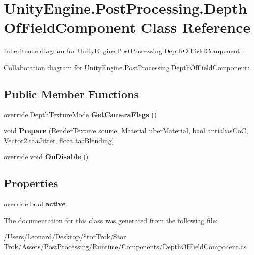 \hypertarget{class_unity_engine_1_1_post_processing_1_1_depth_of_field_component}{}\section{Unity\+Engine.\+Post\+Processing.\+Depth\+Of\+Field\+Component Class Reference}
\label{class_unity_engine_1_1_post_processing_1_1_depth_of_field_component}


Inheritance diagram for Unity\+Engine.\+Post\+Processing.\+Depth\+Of\+Field\+Component\+:


Collaboration diagram for Unity\+Engine.\+Post\+Processing.\+Depth\+Of\+Field\+Component\+:
\subsection*{Public Member Functions}
\begin{DoxyCompactItemize}
\item 
\mbox{\label{class_unity_engine_1_1_post_processing_1_1_depth_of_field_component_ae3e41cb8eaf704a76c63528712d1e6ef}} 
override Depth\+Texture\+Mode {\bfseries Get\+Camera\+Flags} ()
\item 
\mbox{\label{class_unity_engine_1_1_post_processing_1_1_depth_of_field_component_a32180b99bf66ab361b862106862d523c}} 
void {\bfseries Prepare} (Render\+Texture source, Material uber\+Material, bool antialias\+CoC, Vector2 taa\+Jitter, float taa\+Blending)
\item 
\mbox{\label{class_unity_engine_1_1_post_processing_1_1_depth_of_field_component_aec0f639cfc6cbcab6b2ceef5c3de31db}} 
override void {\bfseries On\+Disable} ()
\end{DoxyCompactItemize}
\subsection*{Properties}
\begin{DoxyCompactItemize}
\item 
\mbox{\label{class_unity_engine_1_1_post_processing_1_1_depth_of_field_component_a8df687892189d109e533c6a4320eca73}} 
override bool {\bfseries active}
\end{DoxyCompactItemize}


The documentation for this class was generated from the following file\+:\begin{DoxyCompactItemize}
\item 
/\+Users/\+Leonard/\+Desktop/\+Stor\+Trok/\+Stor Trok/\+Assets/\+Post\+Processing/\+Runtime/\+Components/Depth\+Of\+Field\+Component.\+cs\end{DoxyCompactItemize}
